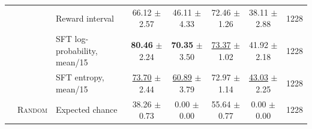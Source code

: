 \begin{table}[t]
\begin{tabular}{lllccccc}
 &  & Reward interval & 66.12 $\pm$ 2.57 & 46.11 $\pm$ 4.33 & 72.46 $\pm$ 1.26 & 38.11 $\pm$ 2.88 & 1228 \\
 &  & SFT log-probability, mean/15 & \textbf{80.46} $\pm$ 2.24 & \textbf{70.35} $\pm$ 3.50 & \underline{73.37} $\pm$ 1.02 & 41.92 $\pm$ 2.18 & 1228 \\
 &  & SFT entropy, mean/15 & \underline{73.70} $\pm$ 2.44 & \underline{60.89} $\pm$ 3.79 & 72.97 $\pm$ 1.14 & \underline{43.03} $\pm$ 2.25 & 1228 \\
 & \textsc{Random} & Expected chance & 38.26 $\pm$ 0.73 & 0.00 $\pm$ 0.00 & 55.64 $\pm$ 0.77 & 0.00 $\pm$ 0.00 & 1228 \\
\bottomrule
\end{tabular}
\end{table}

